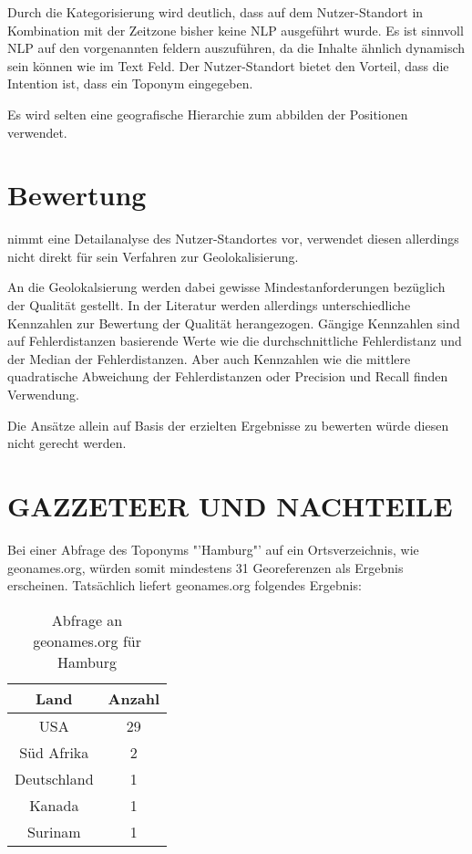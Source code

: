 		Durch die Kategorisierung wird deutlich, dass auf dem Nutzer-Standort in Kombination mit der Zeitzone bisher keine NLP ausgeführt wurde. 
		Es ist sinnvoll NLP auf den vorgenannten feldern auszuführen, da die Inhalte ähnlich dynamisch sein können wie im Text Feld.
		Der Nutzer-Standort bietet den Vorteil, dass die Intention ist, dass ein Toponym eingegeben. 

		Es wird selten eine geografische Hierarchie zum abbilden der Positionen verwendet.


	\section{Bewertung}


			\cite{Hecht2011} nimmt eine Detailanalyse des Nutzer-Standortes vor, verwendet diesen allerdings nicht direkt für sein Verfahren zur Geolokalisierung.   


		An die Geolokalsierung werden dabei gewisse Mindestanforderungen bezüglich der Qualität gestellt.
		In der Literatur werden allerdings unterschiedliche Kennzahlen zur Bewertung der Qualität herangezogen.
		Gängige Kennzahlen sind auf Fehlerdistanzen basierende Werte wie die durchschnittliche Fehlerdistanz und der Median der Fehlerdistanzen.
		Aber auch Kennzahlen wie die mittlere quadratische Abweichung der Fehlerdistanzen oder Precision und Recall finden Verwendung. 

		Die Ansätze allein auf Basis der erzielten Ergebnisse zu bewerten würde diesen nicht gerecht werden.

	\section{GAZZETEER UND NACHTEILE}

		Bei einer Abfrage des Toponyms "'Hamburg"' auf ein Ortsverzeichnis, wie geonames.org, würden somit mindestens 31 Georeferenzen als Ergebnis erscheinen.
		Tatsächlich liefert geonames.org folgendes Ergebnis:

		\begin{table}[htpb]
			\caption{Abfrage an geonames.org für Hamburg} 
			\centering
			\begin{tabular}{|c|c|}
				\hline
				Land & Anzahl\\
				\hline\hline
				USA & 29 \\
				\hline
				Süd Afrika & 2 \\
				\hline
				Deutschland & 1 \\
				\hline
				Kanada & 1 \\
				\hline
				Surinam & 1 \\
				\hline
			\end{tabular}
			\label{tab:usCitiesGermanNamesx} 
		\end{table} 

